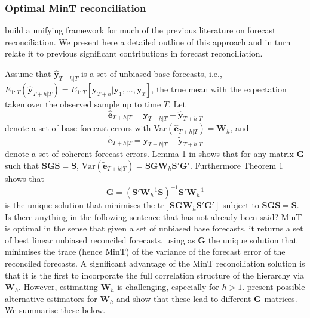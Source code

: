 \documentclass[graybox]{svmult}
\begin{document}
\subsubsection{Optimal MinT reconciliation}

\cite{WicEtAl2019} build a unifying framework for much of the previous literature on forecast reconciliation. We present here a detailed outline of this approach and in turn relate it to previous significant contributions in forecast reconciliation.

Assume that $\hat{\bm{y}}_{T+h|T}$ is a set of unbiased base forecasts, i.e., $E_{1:T}(\hat{\bm{y}}_{T+h|T})= E_{1:T}[\bm{y}_{T+h}|\bm{y}_1,...,\bm{y}_T]$, the true mean with the expectation taken over the observed sample up to time $T$.
Let
\begin{equation}\label{eq:base errors}
\hat{\bm{e}}_{T+h|T} = \bm{y}_{T+h|T}-\hat{\bm{y}}_{T+h|T}
\end{equation}
denote a set of base forecast errors with Var$(\hat{\bm{e}}_{T+h|T})=\bm{W}_h$, and
\begin{equation*}
\tilde{\bm{e}}_{T+h|T} = \bm{y}_{T+h|T}-\tilde{\bm{y}}_{T+h|T}
\end{equation*} denote a set of coherent forecast errors. Lemma 1 in \cite{WicEtAl2019} shows that for any matrix $\bm{G}$ such that $\bm{S}\bm{G}\bm{S}=\bm{S}$, $\text{Var}(\tilde{\bm{e}}_{T+h|T})=\bm{S}\bm{G}\bm{W}_h\bm{S}'\bm{G}'
$. Furthermore Theorem 1 shows that
\begin{equation} \label{eq:MinT}
\bm{G} = (\bm{S}'{\bm{W}}^{-1}_h\bm{S})^{-1}\bm{S}'{\bm{W}}^{-1}_h
\end{equation}
is the unique solution that minimises the tr$[\bm{S}\bm{G}\bm{W}_h\bm{S}'\bm{G}']$ subject to $\bm{S}\bm{G}\bm{S}=\bm{S}$. {\color{red} Is there anything in the following sentence that has not already been said?} MinT is optimal in the sense that given a set of unbiased base forecasts, it returns a set of best linear unbiased reconciled forecasts, using as $\bm{G}$ the unique solution that minimises the trace (hence MinT) of the variance of the forecast error of the reconciled forecasts.
A significant advantage of the MinT reconciliation solution is that it is the first to incorporate the full correlation structure of the hierarchy via ${\bm{W}}_{h}$. However, estimating ${\bm{W}}_{h}$ is challenging, especially for $h>1$. \citet{WicEtAl2019} present possible alternative estimators for ${\bm{W}}_{h}$ and show that these lead to different $\bm{G}$ matrices. We summarise these below.
\end{document}

